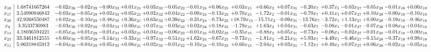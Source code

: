 \documentclass[9pt]{article}
\begin{document}
 \[\begin{array}{c| c c@{\hskip 2pt} c@{\hskip 2pt} c@{\hskip 2pt} c@{\hskip 2pt} c@{\hskip 2pt} c@{\hskip 2pt} c@{\hskip 2pt} c@{\hskip 2pt} c@{\hskip 2pt} c@{\hskip 2pt} c@{\hskip 2pt} c@{\hskip 2pt} c@{\hskip 2pt} c@{\hskip 2pt} c@{\hskip 2pt} c@{\hskip 2pt} c@{\hskip 2pt} }
 x_{10}   &  1.68741667264 & -0.02 x_{30} & -0.02 x_{29} & -0.00 x_{33} & +  0.01 x_{21} & +  0.03 x_{32} & -0.05 x_{22} & -0.01 x_{24} & +  0.06 x_{25} & +  0.03 x_{15} & +  0.66 x_{2} & +  0.07 x_{31} & -0.20 x_{7} & +  0.37 x_{1} & -0.03 x_{27} & -0.05 x_{28} & -0.01 x_{18} & +  0.00 x_{19}\\
 x_{17}   &  3.54990946842 & -0.03 x_{30} & -0.05 x_{29} & +  0.02 x_{33} & +  0.05 x_{21} & +  0.02 x_{32} & +  0.04 x_{22} & -0.09 x_{24} & -0.13 x_{25} & +  0.70 x_{15} & -1.72 x_{2} & -0.01 x_{31} & -0.79 x_{7} & +  0.41 x_{1} & +  0.07 x_{27} & +  0.10 x_{28} & -0.00 x_{18} & -0.10 x_{19}\\
 x_{20}   &  42.9268550487 & +  0.02 x_{30} & -0.10 x_{29} & +  0.48 x_{33} & +  0.36 x_{21} & +  0.63 x_{32} & +  0.39 x_{22} & -0.31 x_{24} & -0.73 x_{25} & + 18.79 x_{15} & -15.71 x_{2} & -0.09 x_{31} & -13.76 x_{7} & -3.72 x_{1} & +  1.13 x_{27} & +  0.00 x_{28} & -0.19 x_{18} & -0.46 x_{19}\\
 x_{4}   &  3.3533730983 & -0.03 x_{30} & +  0.02 x_{29} & -0.04 x_{33} & +  0.00 x_{21} & +  0.07 x_{32} & -0.03 x_{22} & +  0.02 x_{24} & +  0.18 x_{25} & -1.79 x_{15} & +  1.63 x_{2} & +  0.04 x_{31} & -0.63 x_{7} & -0.08 x_{1} & -0.01 x_{27} & -0.07 x_{28} & +  0.08 x_{18} & +  0.04 x_{19}\\
 x_{13}   &  4.18036594221 & -0.05 x_{30} & +  0.01 x_{29} & -0.01 x_{33} & +  0.03 x_{21} & +  0.04 x_{32} & -0.06 x_{22} & -0.01 x_{24} & +  0.02 x_{25} & -0.35 x_{15} & -0.88 x_{2} & +  0.05 x_{31} & -0.73 x_{7} & -0.06 x_{1} & -0.02 x_{27} & -0.01 x_{28} & -0.01 x_{18} & -0.00 x_{19}\\
 x_{23}   &  33.3461812555 & +  0.60 x_{30} & -0.05 x_{29} & -0.14 x_{33} & -0.33 x_{21} & -0.97 x_{32} & -0.51 x_{22} & +  1.62 x_{24} & -0.67 x_{25} & -9.73 x_{15} & -1.81 x_{2} & -0.21 x_{31} & +  5.93 x_{7} & -4.49 x_{1} & -0.46 x_{27} & -0.15 x_{28} & -0.37 x_{18} & +  0.98 x_{19}\\
 x_{11}   &  5.06318845912 & -0.04 x_{30} & -0.04 x_{29} & +  0.05 x_{33} & +  0.08 x_{21} & +  0.02 x_{32} & -0.01 x_{22} & -0.10 x_{24} & -0.10 x_{25} & +  0.60 x_{15} & -2.04 x_{2} & +  0.03 x_{31} & -1.12 x_{7} & +  0.49 x_{1} & +  0.07 x_{27} & +  0.06 x_{28} & -0.02 x_{18} & -0.05 x_{19}\\

\end{array}\]
\end{document}
